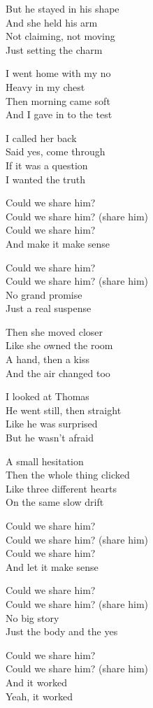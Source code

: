 \begin{lyrics}
But he stayed in his shape\\
And she held his arm\\
Not claiming, not moving\\
Just setting the charm

I went home with my no\\
Heavy in my chest\\
Then morning came soft\\
And I gave in to the test

I called her back\\
Said yes, come through\\
If it was a question\\
I wanted the truth

Could we share him?\\
Could we share him? (share him)\\
Could we share him?\\
And make it make sense

Could we share him?\\
Could we share him? (share him)\\
No grand promise\\
Just a real suspense

Then she moved closer\\
Like she owned the room\\
A hand, then a kiss\\
And the air changed too

I looked at Thomas\\
He went still, then straight\\
Like he was surprised\\
But he wasn't afraid

A small hesitation\\
Then the whole thing clicked\\
Like three different hearts\\
On the same slow drift

Could we share him?\\
Could we share him? (share him)\\
Could we share him?\\
And let it make sense

Could we share him?\\
Could we share him? (share him)\\
No big story\\
Just the body and the yes

Could we share him?\\
Could we share him? (share him)\\
And it worked\\
Yeah, it worked
\end{lyrics}
